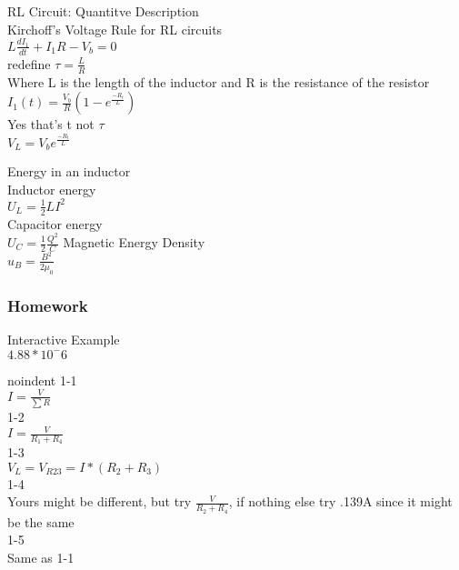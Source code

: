 \documentclass{article}
\begin{document}
\vspace{2mm}

\noindent
RL Circuit: Quantitve Description \\
Kirchoff's Voltage Rule for RL circuits \\
$L \frac{dI_1}{dt} + I_1 R - V_b = 0$ \\
redefine $\tau = \frac{L}{R}$ \\
Where L is the length of the inductor and R is the resistance of the resistor \\
$I_1(t) = \frac{V_b}{R}(1-e^{\frac{-R_t}{L}})$ \\
Yes that's t not $\tau$ \\
$V_L = V_b e^{\frac{-R_t}{L}} $

\vspace{2mm}

\noindent
Energy in an inductor \\
Inductor energy \\
$U_L = \frac{1}{2} L I^2 $ \\
Capacitor energy \\
$U_C = \frac{1}{2} \frac{Q^2}{C}$
Magnetic Energy Density \\
$u_B = \frac{B^2}{2 \mu_0}$

\subsubsection{Homework}
\noindent 
Interactive Example \\
$4.88*10^-6$

\vspace{2mm}

noindent
1-1 \\
$I = \frac{V}{\sum R}$ \\
1-2 \\
$I = \frac{V}{R_1+R_4}$ \\
1-3 \\
$ V_L = V_{R23} = I * (R_2 + R_3)$\\
1-4 \\
Yours might be different, but try $\frac{V}{R_2+R_4}$, if nothing else try .139A since it might be the same \\
1-5 \\
Same as 1-1 

\vspace{2mm}
\end{document}
